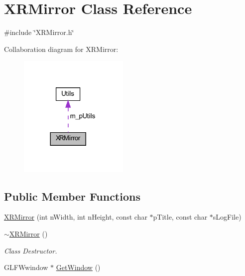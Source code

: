 \hypertarget{class_x_r_mirror}{}\section{X\+R\+Mirror Class Reference}
\label{class_x_r_mirror}


{\ttfamily \#include \char`\"{}X\+R\+Mirror.\+h\char`\"{}}



Collaboration diagram for X\+R\+Mirror\+:\nopagebreak
\begin{figure}[H]
\begin{center}
\leavevmode
\includegraphics[width=149pt]{class_x_r_mirror__coll__graph}
\end{center}
\end{figure}
\subsection*{Public Member Functions}
\begin{DoxyCompactItemize}
\item 
\mbox{\hyperlink{class_x_r_mirror_a8eef43790b56bb299df314080be53ad9}{X\+R\+Mirror}} (int n\+Width, int n\+Height, const char $\ast$p\+Title, const char $\ast$s\+Log\+File)
\item 
\mbox{\hyperlink{class_x_r_mirror_a2406d486889b31a1854d7d276a9e71f2}{$\sim$\+X\+R\+Mirror}} ()
\begin{DoxyCompactList}\small\item\em Class Destructor. \end{DoxyCompactList}\item 
G\+L\+F\+Wwindow $\ast$ \mbox{\hyperlink{class_x_r_mirror_a966faccfee88f1f4ca2b8cfc881658c0}{Get\+Window}} ()
\end{DoxyCompactItemize}

